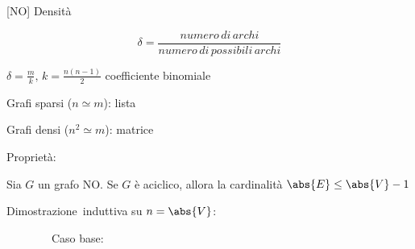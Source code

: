 \documentclass[tikz]{article}
\begin{document}
{{[}NO{]} Densità}

\begin{equation}
\delta=\frac{numero\,di\,archi}{numero\,di\,possibili\,archi}
\end{equation}

{$\delta=\frac{m}{k},\,k = \frac{n(n-1)}{2}$ coefficiente binomiale}


{Grafi sparsi ($n\simeq m$): lista}

{Grafi densi ($n^2\simeq m$): matrice}

{Proprietà:}

{Sia $G$ un grafo NO. Se $G$ è aciclico, allora la cardinalità $\abs{E} \leq \abs{V}-1$}

{Dimostrazione}{~induttiva su $n=\abs{V}$:}

{~~~~~~~~Caso base:}
\end{document}
